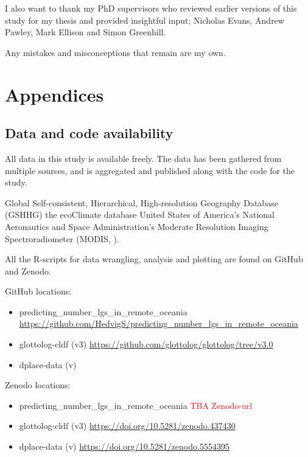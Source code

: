\documentclass[12pt,letterpaper]{article}
\begin{document}
I also want to thank my PhD supervisors who reviewed earlier versions of this study for my thesis \citep{skirgaard2020multilevel} and provided insightful input; Nicholas Evans, Andrew Pawley, Mark Ellison and Simon Greenhill.

Any mistakes and misconceptions that remain are my own.

\newpage
\singlespacing
\appendix
\section*{Appendices}
\renewcommand{\thesubsection}{\Alph{subsection}}

\subsection{Data and code availability}
\label{supp_data_availability}

All data in this study is available freely. The data has been gathered from multiple sources, and is aggregated and published along with the code for the study.

Global Self-consistent, Hierarchical, High-resolution Geography Database (GSHHG) \citep{wessel1996global}
the ecoClimate database \citep{ecoclimate} 
United States of America's National Aeronautics and Space Administration's Moderate Resolution Imaging Spectroradiometer (MODIS, \citet{running2021modis_terra, running2021modis_aqua}).

All the R-scripts for data wrangling, analysis and plotting are found on GitHub and Zenodo.

GitHub locations:
\begin{itemize}
\item predicting\_number\_lgs\_in\_remote\_oceania  \url{https://github.com/HedvigS/predicting_number_lgs_in_remote_oceania}
\item glottolog-cldf (v3) \url{https://github.com/glottolog/glottolog/tree/v3.0}
\item dplace-data (v) \url{}
\end{itemize}

Zenodo locations:
\begin{itemize}
\item predicting\_number\_lgs\_in\_remote\_oceania  \textcolor{red}{TBA Zenodo-url}
\item glottolog-cldf (v3) \url{https://doi.org/10.5281/zenodo.437430}
\item dplace-data (v) \url{https://doi.org/10.5281/zenodo.5554395}
\end{itemize}
\end{document}
